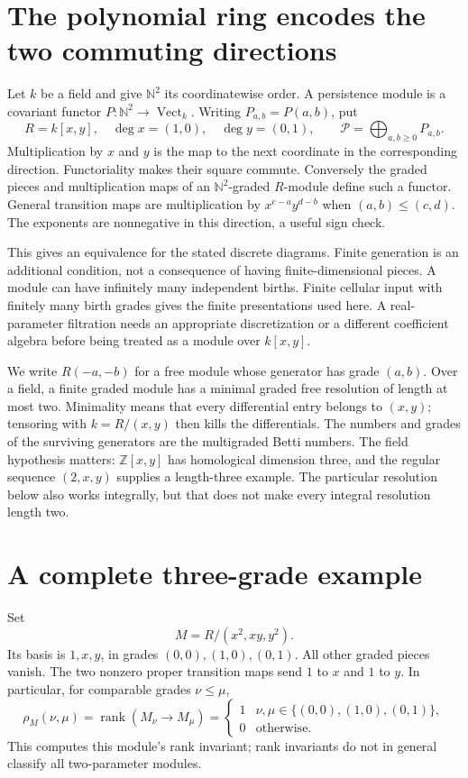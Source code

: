 \documentclass[11pt,oneside,openany]{book}
\theoremstyle{definition}\newtheorem{definition}[theorem]{Definition}
\theoremstyle{remark}\newtheorem{remark}[theorem]{Remark}
\begin{document}
\section{The polynomial ring encodes the two commuting directions}
Let $k$ be a field and give $\mathbb N^2$ its coordinatewise order. A
persistence module is a covariant functor $P:\mathbb N^2\to\operatorname{Vect}_k$.
Writing $P_{a,b}=P(a,b)$, put
\[
 R=k[x,y],\quad \deg x=(1,0),\quad\deg y=(0,1),\qquad
 \mathcal P=\bigoplus_{a,b\ge0}P_{a,b}.
\]
Multiplication by $x$ and $y$ is the map to the next coordinate in the
corresponding direction. Functoriality makes their square commute.
Conversely the graded pieces and multiplication maps of an
$\mathbb N^2$-graded $R$-module define such a functor. General transition
maps are multiplication by $x^{c-a}y^{d-b}$ when $(a,b)\le(c,d)$.
The exponents are nonnegative in this direction, a useful sign check.

This gives an equivalence for the stated discrete diagrams. Finite
generation is an additional condition, not a consequence of having
finite-dimensional pieces. A module can have infinitely many independent
births. Finite cellular input with finitely many birth grades gives the
finite presentations used here. A real-parameter filtration needs an
appropriate discretization or a different coefficient algebra before
being treated as a module over $k[x,y]$.

We write $R(-a,-b)$ for a free module whose generator has grade $(a,b)$.
Over a field, a finite graded module has a minimal graded free resolution
of length at most two. Minimality means that every differential entry
belongs to $(x,y)$; tensoring with $k=R/(x,y)$ then kills the differentials.
The numbers and grades of the surviving generators are the multigraded
Betti numbers. The field hypothesis matters: $\mathbb Z[x,y]$ has
homological dimension three, and the regular sequence $(2,x,y)$ supplies
a length-three example. The particular resolution below also works
integrally, but that does not make every integral resolution length two.

\section{A complete three-grade example}
Set
\[
 M=R/(x^2,xy,y^2).
\]
Its basis is $1,x,y$, in grades $(0,0),(1,0),(0,1)$. All other graded
pieces vanish. The two nonzero proper transition maps send $1$ to $x$
and $1$ to $y$. In particular, for comparable grades $\nu\le\mu$,
\[
 \rho_M(\nu,\mu)=\operatorname{rank}(M_\nu\to M_\mu)
 =\begin{cases}1&\nu,\mu\in\{(0,0),(1,0),(0,1)\},\\0&\text{otherwise.}\end{cases}
\]
This computes this module's rank invariant; rank invariants do not in
general classify all two-parameter modules.
\end{document}
